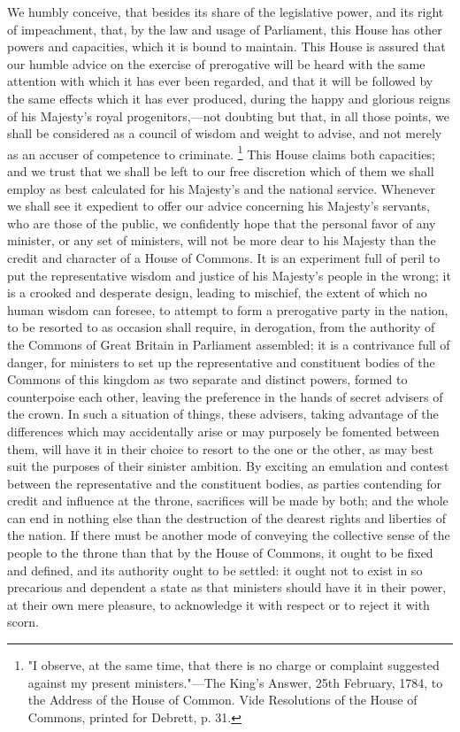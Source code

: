 We humbly conceive, that besides its share of the legislative power, and its right of impeachment, that, by the law and usage of Parliament, this House has other powers and capacities, which it is bound to maintain. This House is assured that our humble advice on the exercise of prerogative will be heard with the same attention with which it has ever been regarded, and that it will be followed by the same effects which it has ever produced, during the happy and glorious reigns of his Majesty's royal progenitors,—not doubting but that, in all those points, we shall be considered as a council of wisdom and weight to advise, and not merely as an accuser of competence to criminate. 
\footnote{ "I observe, at the same time, that there is no charge or complaint suggested against my present ministers."—The King's Answer, 25th February, 1784, to the Address of the House of Common. Vide Resolutions of the House of Commons, printed for Debrett, p. 31.}
 This House claims both capacities; and we trust that we shall be left to our free discretion which of them we shall employ as best calculated for his Majesty's and the national service. Whenever we shall see it expedient to offer our advice concerning his Majesty's servants, who are those of the public, we confidently hope that the personal favor of any minister, or any set of ministers, will not be more dear to his Majesty than the credit and character of a House of Commons. It is an experiment full of peril to put the representative wisdom and justice of his Majesty's people in the wrong; it is a crooked and desperate design, leading to mischief, the extent of which no human wisdom can foresee, to attempt to form a prerogative party in the nation, to be resorted to as occasion shall require, in derogation, from the authority of the Commons of Great Britain in Parliament assembled; it is a contrivance full of danger, for ministers to set up the representative and constituent bodies of the Commons of this kingdom as two separate and distinct powers, formed to counterpoise each other, leaving the preference in the hands of secret advisers of the crown. In such a situation of things, these advisers, taking advantage of the differences which may accidentally arise or may purposely be fomented between them, will have it in their choice to resort to the one or the other, as may best suit the purposes of their sinister ambition. By exciting an emulation and contest between the representative and the constituent bodies, as parties contending for credit and influence at the throne, sacrifices will be made by both; and the whole can end in nothing else than the destruction of the dearest rights and liberties of the nation. If there must be another mode of conveying the collective sense of the people to the throne than that by the House of Commons, it ought to be fixed and defined, and its authority ought to be settled: it ought not to exist in so precarious and dependent a state as that ministers should have it in their power, at their own mere pleasure, to acknowledge it with respect or to reject it with scorn.

